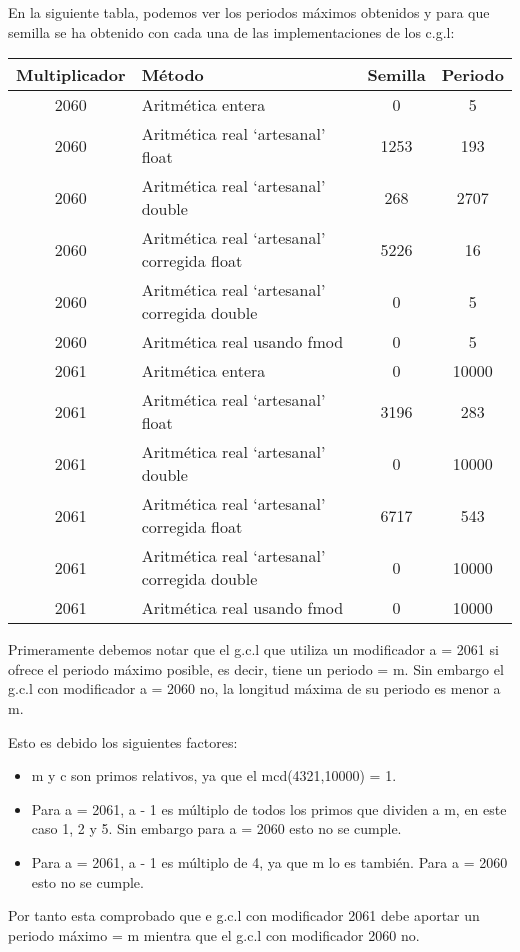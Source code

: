 En la siguiente tabla, podemos ver los periodos máximos obtenidos y para que semilla se ha obtenido con cada una de las implementaciones de los c.g.l:
\begin{table}[H]
\centering
\begin{tabular}{|c|l|c|c|}
\hline
\textbf{Multiplicador} & \textbf{Método} & \textbf{Semilla} & \textbf{Periodo} \\ \hline
2060 & Aritmética entera & 0 & 5 \\
2060 & Aritmética real `artesanal' float & 1253 & 193 \\
2060 & Aritmética real `artesanal' double & 268 & 2707 \\
2060 & Aritmética real `artesanal' corregida float & 5226 & 16 \\
2060 & Aritmética real `artesanal' corregida double & 0 & 5 \\
2060 & Aritmética real usando fmod & 0 & 5 \\
2061 & Aritmética entera & 0 & 10000 \\
2061 & Aritmética real `artesanal' float & 3196 & 283 \\
2061 & Aritmética real `artesanal' double & 0 & 10000 \\
2061 & Aritmética real `artesanal' corregida float & 6717 & 543 \\
2061 & Aritmética real `artesanal' corregida double & 0 & 10000 \\
2061 & Aritmética real usando fmod & 0 & 10000 \\ \hline
\end{tabular}
\end{table}
Primeramente debemos notar que el g.c.l que utiliza un modificador a = 2061 si ofrece el periodo máximo posible, es decir, tiene un periodo = m. Sin embargo el g.c.l con modificador a = 2060 no, la longitud máxima de su periodo es menor a m.

\newpage

Esto es debido los siguientes factores:
\begin{itemize}
	\item m y c son primos relativos, ya que el mcd(4321,10000) = 1.
	\item Para a = 2061, a - 1 es múltiplo de todos los primos que dividen a m, en este caso 1, 2 y 5. Sin embargo para a = 2060 esto no se cumple.
	\item Para a = 2061, a - 1 es múltiplo de 4, ya que m lo es también. Para a = 2060 esto no se cumple.
\end{itemize}
Por tanto esta comprobado que e g.c.l con modificador 2061 debe aportar un periodo máximo = m mientra que el g.c.l con modificador 2060 no.

